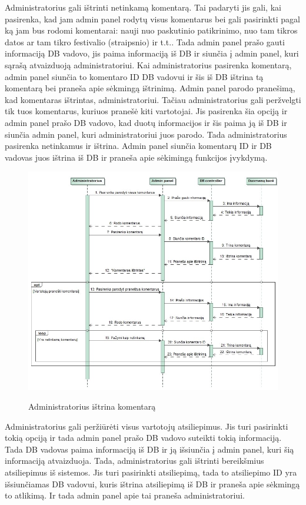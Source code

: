 ﻿\documentclass{VUMIFPSkursinis}
\begin{document}
Administratorius gali ištrinti netinkamą komentarą. Tai padaryti jis gali, kai pasirenka, kad jam admin panel rodytų visus komentarus bei gali pasirinkti pagal ką jam bus rodomi komentarai: nauji nuo paskutinio patikrinimo, nuo tam tikros datos ar tam tikro festivalio (straipsnio) ir t.t.. Tada admin panel prašo gauti informaciją DB vadovo, jis paima informaciją iš DB ir siunčia į admin panel, kuri sąrašą atvaizduoją administratoriui. Kai administratorius pasirenka komentarą, admin panel siunčia to komentaro ID DB vadovui ir šis iš DB ištrina tą komentarą bei praneša apie sėkmingą ištrinimą. Admin panel parodo pranešimą, kad komentaras ištrintas, administratoriui. 
	Tačiau administratorius gali peržvelgti tik tuos komentarus, kuriuos pranešė kiti vartotojai. Jis pasirenka šia opciją ir admin panel prašo DB vadovo, kad duotų informacijos ir šis paima ją iš DB ir siunčia admin panel, kuri administratoriui juos parodo. Tada administratorius pasirenka netinkamus ir ištrina. Admin panel siunčia komentarų ID ir DB vadovas juos ištrina iš DB ir praneša apie sėkimingą funkcijos įvykdymą.

\begin{figure}[H]
    \centering
    \includegraphics[scale=0.45]{img/Pav/AdminIstrintiKomentarus}
    \label{img:uml14}
	\caption{Administratorius ištrina komentarą}
\end{figure}	
	
Administratorius gali peržiūrėti visus vartotojų atsiliepimus. Jis turi pasirinkti tokią opciją ir tada admin panel prašo DB vadovo suteikti tokią informaciją. Tada DB vadovas paima informaciją iš DB ir ją išsiunčia į admin panel, kuri šią informaciją atvaizduoja. Tada, administratorius gali ištrinti bereikšmius atsiliepimus iš sistemos. Jis turi pasirinkti atsiliepimą, tada to atsiliepimo ID yra išsiunčiamas DB vadovui, kuris ištrina atsiliepimą iš DB ir praneša apie sėkmingą to atlikimą. Ir tada admin panel apie tai praneša administratoriui.
	
\end{document}
